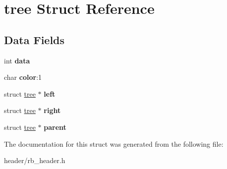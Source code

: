 \hypertarget{structtree}{\section{tree Struct Reference}
\label{structtree}
}
\subsection*{Data Fields}
\begin{DoxyCompactItemize}
\item 
\hypertarget{structtree_a9eab91667db4d35c7231dcddf7b89a76}{int {\bfseries data}}\label{structtree_a9eab91667db4d35c7231dcddf7b89a76}

\item 
\hypertarget{structtree_ae2d77c102b2d2d3f0881c0e2bcdbe777}{char {\bfseries color}\-:1}\label{structtree_ae2d77c102b2d2d3f0881c0e2bcdbe777}

\item 
\hypertarget{structtree_a7c6cea39f2bf20021d7ec6c5498b8fce}{struct \hyperlink{structtree}{tree} $\ast$ {\bfseries left}}\label{structtree_a7c6cea39f2bf20021d7ec6c5498b8fce}

\item 
\hypertarget{structtree_a932846042594742606d4a17a0fc7777f}{struct \hyperlink{structtree}{tree} $\ast$ {\bfseries right}}\label{structtree_a932846042594742606d4a17a0fc7777f}

\item 
\hypertarget{structtree_ab52ca48dd0d68750adca1e74c9bb53d8}{struct \hyperlink{structtree}{tree} $\ast$ {\bfseries parent}}\label{structtree_ab52ca48dd0d68750adca1e74c9bb53d8}

\end{DoxyCompactItemize}


The documentation for this struct was generated from the following file\-:\begin{DoxyCompactItemize}
\item 
header/rb\-\_\-header.\-h\end{DoxyCompactItemize}
